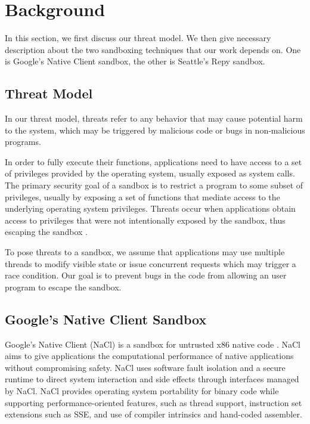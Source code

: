 \section{Background}
\label{sec.background}


\par
In this section, we first discuss our threat model. We then give necessary description about the two sandboxing techniques that our work depends on. One is Google's Native Client sandbox, the other is Seattle's Repy sandbox. 


\subsection{Threat Model}

\par
In our threat model, threats refer to any behavior that may cause potential harm to the system, which may be triggered by malicious code or bugs in non-malicious programs.

\par
In order to fully execute their functions, applications need to have access to a set of privileges provided by the operating system, usually exposed as system calls. The primary security goal of a sandbox is to restrict a program to some subset of privileges, usually by exposing a set of functions that mediate access to the underlying operating system privileges. Threats occur when applications obtain access to privileges that were not intentionally exposed by the sandbox, thus escaping the sandbox \cite{Repy:10}.

\par
To pose threats to a sandbox, we assume that applications may use multiple threads to modify visible state or issue concurrent requests which may trigger a race condition. Our goal is to prevent bugs in the code from allowing an user program to escape the sandbox.


\subsection{Google's Native Client Sandbox}

\par
Google's Native Client (NaCl) is a sandbox for untrusted x86 native code \cite{NaCl:09}. NaCl aims to give applications the computational performance of native applications without compromising safety. NaCl uses software fault isolation and a secure runtime to direct system interaction and side effects through interfaces managed by NaCl. NaCl provides operating system portability for binary code while supporting performance-oriented features, such as thread support, instruction set extensions such as SSE, and use of compiler intrinsics and hand-coded assembler. 

